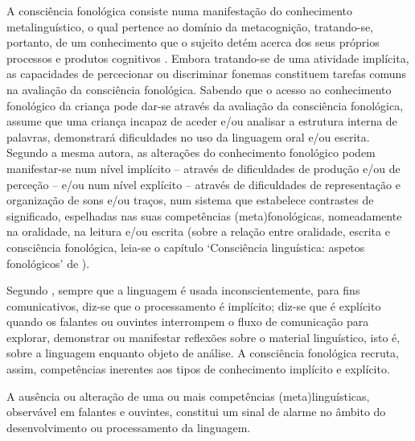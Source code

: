 \documentclass[output=paper,colorlinks,citecolor=brown,booklanguage=portuguese]{langscibook}
\begin{document}
A consciência fonológica consiste numa manifestação do conhecimento metalinguístico, o qual pertence ao domínio da metacognição, tratando-se, portanto, de um conhecimento que o sujeito detém acerca dos seus próprios processos e produtos cognitivos \citep{Gombert1990}. Embora tratando-se de uma atividade implícita, as capacidades de percecionar ou discriminar fonemas constituem tarefas comuns na avaliação da consciência fonológica.
Sabendo que o acesso ao conhecimento fonológico da criança pode dar-se através da avaliação da consciência fonológica, \citet{Shaywitz2004} assume que uma criança incapaz de aceder e/ou analisar a estrutura interna de palavras, demonstrará dificuldades no uso da linguagem oral e/ou escrita. Segundo a mesma autora, as alterações do conhecimento fonológico podem manifestar-se num nível implícito -- através de dificuldades de produção e/ou de perceção -- e/ou num nível explícito -- através de dificuldades de representação e organização de sons e/ou traços, num sistema que estabelece contrastes de significado, espelhadas nas suas competências (meta)fonológicas, nomeadamente na oralidade, na leitura e/ou escrita (sobre a relação entre oralidade, escrita e consciência fonológica, leia-se o capítulo ‘Consciência linguística: aspetos fonológicos’ de \citealp{Miranda2017}).

Segundo \citet{Alves2019}, sempre que a linguagem é usada inconscientemente, para fins comunicativos, diz-se que o processamento é implícito; diz-se que é explícito quando os falantes ou ouvintes interrompem o fluxo de comunicação para explorar, demonstrar ou manifestar reflexões sobre o material linguístico, isto é, sobre a linguagem enquanto objeto de análise. A consciência fonológica recruta, assim, competências inerentes aos tipos de conhecimento implícito e explícito. 

A ausência ou alteração de uma ou mais competências (meta)linguísticas, observável em falantes e ouvintes, constitui um sinal de alarme no âmbito do desenvolvimento ou processamento da linguagem. 
\end{document}
